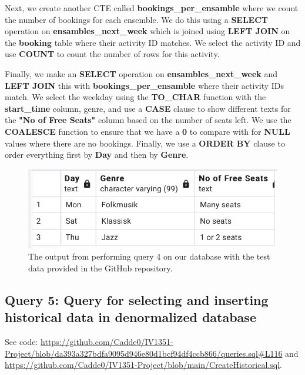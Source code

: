 \documentclass[a4paper]{scrartcl}
\begin{document}
Next, we create another CTE called \textbf{bookings\_per\_ensamble} where we count the number of bookings for each ensemble. We do this using a \textbf{SELECT} operation on \textbf{ensambles\_next\_week} which is joined using \textbf{LEFT JOIN} on the \textbf{booking} table where their activity ID matches. We select the activity ID and use \textbf{COUNT} to count the number of rows for this activity.

Finally, we make an \textbf{SELECT} operation on \textbf{ensambles\_next\_week} and \textbf{LEFT JOIN} this with \textbf{bookings\_per\_ensamble} where their activity IDs match. We select the weekday using the \textbf{TO\_CHAR} function with the \textbf{start\_time} column, genre, and use a \textbf{CASE} clause to show different texts for the \textbf{"No of Free Seats" } column based on the number of seats left. We use the \textbf{COALESCE} function to ensure that we have a \textbf{0} to compare with for \textbf{NULL} values where there are no bookings. Finally, we use a \textbf{ORDER BY} clause to order everything first by \textbf{Day} and then by \textbf{Genre}.



\begin{figure}[H]
    \begin{center}
      \includegraphics[scale=0.6]{query4_output.png}
      \caption{The output from performing query 4 on our database with the test data provided in the GitHub repository.}
      \label{fig:diag}
    \end{center}
  \end{figure}


\subsection{Query 5: Query for selecting and inserting historical data in denormalized database}
See code: \url{https://github.com/Cadde0/IV1351-Project/blob/da393a327bdfa9095d946e80d1bcf94df4ccb866/queries.sql#L116} and \url{https://github.com/Cadde0/IV1351-Project/blob/main/CreateHistorical.sql}.
\end{document}
